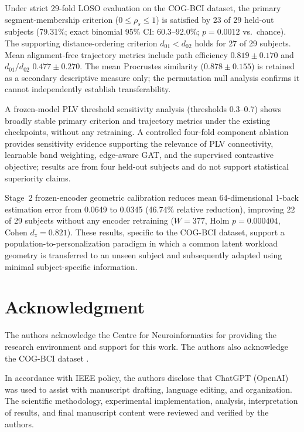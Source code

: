 \documentclass{ieeeaccess}
\begin{document}
Under strict 29-fold LOSO evaluation on the COG-BCI dataset, the primary
segment-membership criterion ($0\leq\rho_s\leq1$) is satisfied by 23 of 29
held-out subjects (79.31\%; exact binomial 95\% CI: 60.3--92.0\%;
$p=0.0012$ vs.\ chance). The supporting distance-ordering criterion
$d_{01}<d_{02}$ holds for 27 of 29 subjects. Mean alignment-free trajectory
metrics include path efficiency $0.819\pm0.170$ and $d_{01}/d_{02}$
$0.477\pm0.270$. The mean Procrustes similarity ($0.878\pm0.155$) is retained
as a secondary descriptive measure only; the permutation null analysis
confirms it cannot independently establish transferability.

A frozen-model PLV threshold sensitivity analysis (thresholds 0.3--0.7)
shows broadly stable primary criterion and trajectory metrics under the
existing checkpoints, without any retraining. A controlled four-fold component
ablation provides sensitivity evidence supporting the relevance of PLV
connectivity, learnable band weighting, edge-aware GAT, and the supervised
contrastive objective; results are from four held-out subjects and do not
support statistical superiority claims.

Stage~2 frozen-encoder geometric calibration reduces mean 64-dimensional
1-back estimation error from 0.0649 to 0.0345 (46.74\% relative reduction),
improving 22 of 29 subjects without any encoder retraining
($W=377$, Holm $p=0.000404$, Cohen $d_z=0.821$). These results, specific
to the COG-BCI dataset, support a population-to-personalization paradigm in
which a common latent workload geometry is transferred to an unseen subject
and subsequently adapted using minimal subject-specific information.

\section*{Acknowledgment}
The authors acknowledge the Centre for Neuroinformatics for providing the
research environment and support for this work. The authors also acknowledge
the COG-BCI dataset \cite{hinss2023}.

In accordance with IEEE policy, the authors disclose that ChatGPT (OpenAI)
was used to assist with manuscript drafting, language editing, and
organization. The scientific methodology, experimental implementation,
analysis, interpretation of results, and final manuscript content were
reviewed and verified by the authors.





\EOD
\end{document}
